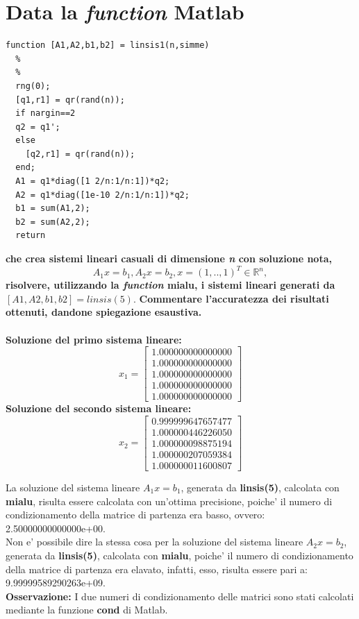 \documentclass[10pt,a4paper]{article}
\begin{document}
\section{Data la \textit{function} Matlab}
\begin{lstlisting}[style=Matlab-editor]
  function [A1,A2,b1,b2] = linsis1(n,simme)
  %
  %
  rng(0);
  [q1,r1] = qr(rand(n));
  if nargin==2
  q2 = q1';
  else
    [q2,r1] = qr(rand(n));
  end;
  A1 = q1*diag([1 2/n:1/n:1])*q2;
  A2 = q1*diag([1e-10 2/n:1/n:1])*q2;
  b1 = sum(A1,2);
  b2 = sum(A2,2);
  return
\end{lstlisting}
\textbf{che crea sistemi lineari casuali di dimensione \textit{n} con soluzione nota,}
$$ A_1x = b_1, A_2x = b_2, x = (1,..,1)^T \in \mathbb{R}^{\textit{n}}, $$
\textbf{risolvere, utilizzando la \textit{function} \textbf{mialu}, i sistemi lineari generati da
  $ [A1,A2,b1,b2]=linsis(5)$}.
\textbf{Commentare l'accuratezza dei risultati ottenuti, dandone spiegazione esaustiva.}
\\\\
\textbf{Soluzione del primo sistema lineare:}
\[
  x_1 =
  \begin{bmatrix}
    1.000000000000000 \\
    1.000000000000000 \\
    1.000000000000000 \\
    1.000000000000000 \\
    1.000000000000000
  \end{bmatrix}
\]
\textbf{Soluzione del secondo sistema lineare:}
\[
  x_2 =
  \begin{bmatrix}
    0.999999647657477 \\
    1.000000446226050 \\
    1.000000098875194 \\
    1.000000207059384 \\
    1.000000011600807
  \end{bmatrix}
\]

La soluzione del sistema lineare $ A_1x = b_1 $, generata da \textbf{linsis(5)}, calcolata con \textbf{mialu},
risulta essere calcolata con un'ottima precisione, poiche' il numero di condizionamento della matrice
di partenza era basso, ovvero: 2.50000000000000e+00.
\\
Non e' possibile dire la stessa cosa per la soluzione del sistema lineare $ A_2x = b_2 $, generata da \textbf{linsis(5)},
calcolata con \textbf{mialu}, poiche' il numero di condizionamento della matrice di partenza era elavato, infatti,
esso, risulta essere pari a: 9.99999589290263e+09.
\\
\textbf{Osservazione:} I due numeri di condizionamento delle matrici sono stati calcolati mediante la funzione \textbf{cond} di Matlab.
\end{document}
